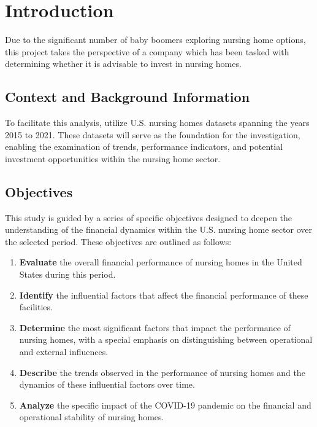 \documentclass{article}
\theoremstyle{mytheoremstyle}
\theoremstyle{mytheoremstyle}
\theoremstyle{myproblemstyle}
\begin{document}
\section{Introduction}

Due to the significant number of baby boomers exploring nursing home options, this project takes the perspective of a company which has been tasked with determining whether it is advisable to invest in nursing homes.

\subsection{Context and Background Information}

To facilitate this analysis, utilize U.S. nursing homes datasets spanning the years 2015 to 2021. These datasets will serve as the foundation for the investigation, enabling the examination of trends, performance indicators, and potential investment opportunities within the nursing home sector.

\subsection{Objectives}

This study is guided by a series of specific objectives designed to deepen the understanding of the financial dynamics within the U.S. nursing home sector over the selected period. These objectives are outlined as follows:

\begin{enumerate}
    \item \textbf{Evaluate} the overall financial performance of nursing homes in the United States during this period.
    \item \textbf{Identify} the influential factors that affect the financial performance of these facilities.
    \item \textbf{Determine} the most significant factors that impact the performance of nursing homes, with a special emphasis on distinguishing between operational and external influences.
    \item \textbf{Describe} the trends observed in the performance of nursing homes and the dynamics of these influential factors over time.
    \item \textbf{Analyze} the specific impact of the COVID-19 pandemic on the financial and operational stability of nursing homes.
\end{enumerate}
\end{document}
